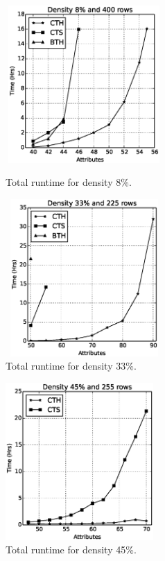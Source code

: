 \documentclass[authoryear,11pt]{elsarticle}
\begin{document}
	\begin{figure}[htb]
	\centering
	\begin{minipage}{.5\textwidth}
	  \centering
	   \includegraphics[width=6cm , height=6cm]{low_density.eps}
	  \caption{Total runtime for density 8\%.}
	  \label{fig:result1}
	\end{minipage}%
	\begin{minipage}{.5\textwidth}
	  \centering
	   \includegraphics[width=6cm , height=6cm]{med_density.eps}
	  \caption{Total runtime for density 33\%.}
	  \label{fig:result2}
	\end{minipage}
	\end{figure}
	
	\begin{figure}[htb]
	    \begin{center}
	       \includegraphics[height=6cm]{med48_density.eps}
	    \end{center}
	\caption{Total runtime for density 45\%.}
	\label{fig:result3}
	\end{figure}	
	
\end{document}
